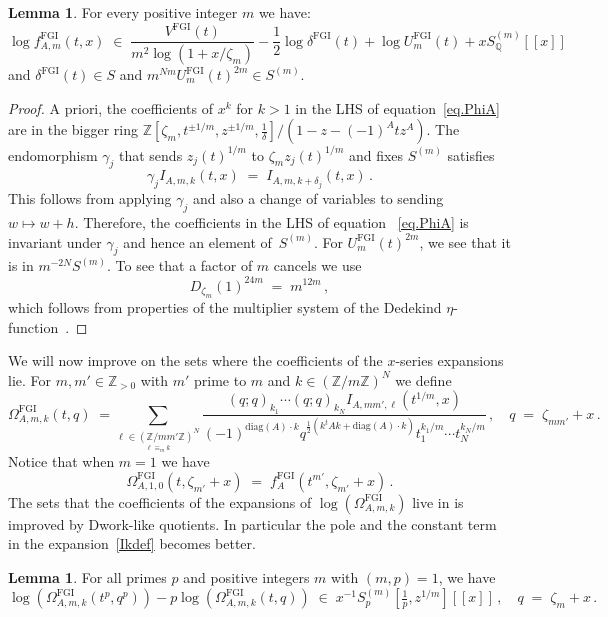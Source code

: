 \documentclass[12pt,reqno]{amsart}
\theoremstyle{definition}
\newtheorem{lemma}[proposition]{Lemma}
\def\BZ{\mathbb Z}
\def\BQ{\mathbb Q}
\def\be{\begin{equation}}
\def\ee{\end{equation}}
\def\z{\zeta}
\def\={\;=\;}
\def\inn{\;\in\;}
\def\FGI{\mathrm{FGI}}
\def\CS{\Omega^{\FGI}}
\def\Phitof{f}
\begin{document}
\begin{lemma}
\label{lem.PhiA}
For every positive integer $m$ we have: 
\be
\label{eq.PhiA}
\log \Phitof^\FGI_{A,m}(t,x) \inn \frac{V^\FGI(t)}{m^2\log(1+x/\z_m)}
-\frac{1}{2} \log \delta^\FGI(t) + \log U_m^\FGI(t) + x S^{(m)}_\BQ[\![x]\!] 
\ee
and $\delta^\FGI(t) \in S$ and $m^{N m} U_m^\FGI(t)^{2m} \in S^{(m)}$. 
\end{lemma}

\begin{proof}
A priori, the coefficients of $x^k$ for $k>1$ in the LHS of equation~\eqref{eq.PhiA}
are in the bigger ring $\BZ[\z_m,t^{\pm 1/m}, z^{\pm 1/m}, \tfrac{1}{\delta}]/(1-z-(-1)^A
t z^A)$. The endomorphism $\gamma_j$ that sends $z_j(t)^{1/m}$ to $\z_m z_j(t)^{1/m}$
and fixes $S^{(m)}$ satisfies
\be
\gamma_j I_{A,m,k}(t,x) \= I_{A,m,k+\delta_j}(t,x) \,.
\ee
This follows from applying $\gamma_j$ and also a change of variables to sending
$w \mapsto w + h$. Therefore, the coefficients in the LHS of equation
~\eqref{eq.PhiA} is invariant under $\gamma_j$ and hence an element of~$S^{(m)}$.
For $U_{m}^\FGI(t)^{2m}$, we see that it is in $m^{-2N}S^{(m)}$. To see
that a factor of $m$ cancels we use
\be
D_{\z_m}(1)^{24m} \= m^{12m}\,,
\ee
which follows from properties of the multiplier system of the Dedekind
$\eta$-function~\cite{Rademacher}.
\end{proof}

We will now improve on the sets where the coefficients of the $x$-series expansions
lie. For
$m,m'\in\BZ_{>0}$ with $m'$ prime to $m$ and $k\in(\BZ/m\BZ)^{N}$ we define
\be
\label{FGIcong}
\CS_{A,m,k}(t,q) \;=\!\!\!\!
\sum_{\underset{\ell\equiv_m k}{\ell\in(\BZ/mm'\BZ)^{N}}}
\frac{(q;q)_{k_1}\cdots(q;q)_{k_N}I_{A,mm',\ell}(t^{1/m},x)}
{(-1)^{\mathrm{diag}(A)\cdot k}q^{\frac{1}{2}(k^t A k + \mathrm{diag}(A)\cdot k)}
t_1^{k_1/m} \cdots t_{N}^{k_N/m}} \,,\quad q\=\z_{mm'}+x\,.
\ee
Notice that when $m=1$ we have
\be
\CS_{A,1,0}(t,\z_{m'}+x) \= \Phitof_{A}^{\FGI}(t^{m'},\z_{m'}+x)\,.
\ee
The sets that the coefficients of the expansions of $\log(\CS_{A,m,k})$ live in
is improved by Dwork-like quotients. In particular the pole and the constant
term in the expansion~\eqref{Ikdef} becomes better.

\begin{lemma}
\label{lem:dwork.diff.VU} 
For all primes $p$ and positive integers $m$ with $(m,p)=1$, we have 
\be
\label{dphiA2}
\log(\CS_{A,m,k}(t^p,q^p)) -p\log(\CS_{A,m,k}(t,q))
\inn x^{-1}S^{(m)}_p[\tfrac{1}{p},z^{1/m}] [\![x]\!]\,,\quad
  q\=\z_{m}+x\,.
\ee
\end{lemma}
\end{document}
